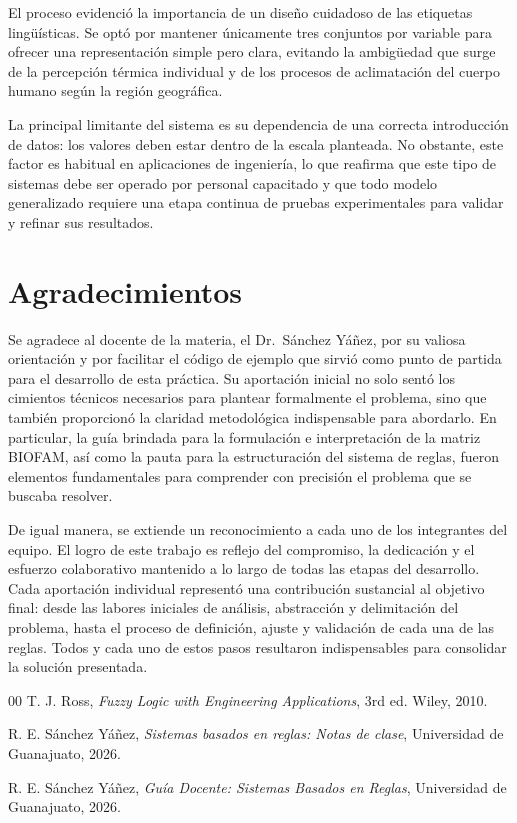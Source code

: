 \documentclass[conference]{IEEEtran}
\begin{document}
El proceso evidenció la importancia de un diseño cuidadoso de las etiquetas lingüísticas. Se optó por mantener únicamente tres conjuntos por variable para ofrecer una representación simple pero clara, evitando la ambigüedad que surge de la percepción térmica individual y de los procesos de aclimatación del cuerpo humano según la región geográfica.

La principal limitante del sistema es su dependencia de una correcta introducción de datos: los valores deben estar dentro de la escala planteada. No obstante, este factor es habitual en aplicaciones de ingeniería, lo que reafirma que este tipo de sistemas debe ser operado por personal capacitado y que todo modelo generalizado requiere una etapa continua de pruebas experimentales para validar y refinar sus resultados.

\section*{Agradecimientos}
Se agradece al docente de la materia, el Dr.\ Sánchez Yáñez, por su valiosa orientación y por facilitar el código de ejemplo que sirvió como punto de partida para el desarrollo de esta práctica. Su aportación inicial no solo sentó los cimientos técnicos necesarios para plantear formalmente el problema, sino que también proporcionó la claridad metodológica indispensable para abordarlo. En particular, la guía brindada para la formulación e interpretación de la matriz BIOFAM, así como la pauta para la estructuración del sistema de reglas, fueron elementos fundamentales para comprender con precisión el problema que se buscaba resolver.

De igual manera, se extiende un reconocimiento a cada uno de los integrantes del equipo. El logro de este trabajo es reflejo del compromiso, la dedicación y el esfuerzo colaborativo mantenido a lo largo de todas las etapas del desarrollo. Cada aportación individual representó una contribución sustancial al objetivo final: desde las labores iniciales de análisis, abstracción y delimitación del problema, hasta el proceso de definición, ajuste y validación de cada una de las reglas. Todos y cada uno de estos pasos resultaron indispensables para consolidar la solución presentada.

\begin{thebibliography}{00}
T. J. Ross, \textit{Fuzzy Logic with Engineering Applications}, 3rd ed. Wiley, 2010.

R. E. Sánchez Yáñez, \textit{Sistemas basados en reglas: Notas de clase}, Universidad de Guanajuato, 2026.

R. E. Sánchez Yáñez, \textit{Guía Docente: Sistemas Basados en Reglas}, Universidad de Guanajuato, 2026.
\end{thebibliography}
\end{document}
